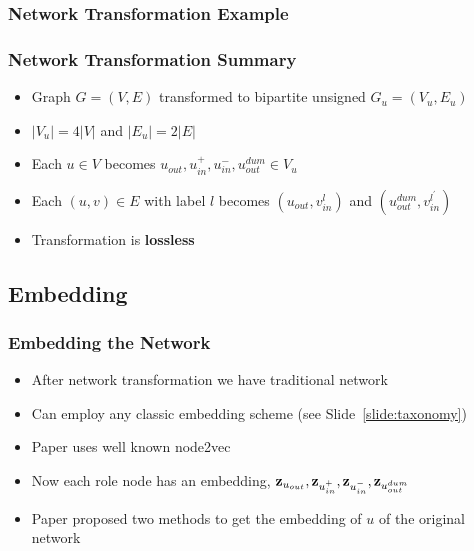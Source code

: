 \documentclass{beamer}
\begin{document}
\begin{frame}
    \frametitle{Network Transformation Example}
    
\end{frame}

\begin{frame}
    \frametitle{Network Transformation Summary}
    \begin{itemize}
        \item Graph $G=(V,E)$ transformed to bipartite unsigned $G_{u}=(V_{u},E_{u})$
        \item $|V_{u}|=4|V|$ and $|E_{u}|=2|E|$
        \item Each $u \in V$ becomes $u_{out},u_{in}^{+},u_{in}^{-},u_{out}^{dum} \in V_{u}$
        \item Each $(u,v) \in E$ with label $l$ becomes $(u_{out},v_{in}^{l})$ and $(u_{out}^{dum},v_{in}^{l^{\prime}})$
        \item Transformation is \textbf{lossless}
    \end{itemize}

\end{frame}


\subsection{Embedding}
\begin{frame}
    \frametitle{Embedding the Network}
    \begin{itemize}
        \item After network transformation we have traditional network
        \item Can employ any classic embedding scheme (see Slide~\ref{slide:taxonomy})
        \item Paper uses well known node2vec
        \item Now each role node has an embedding, $\mathbf{z}_{u_{out}},\mathbf{z}_{u_{in}^{+}},\mathbf{z}_{u_{in}^{-}},\mathbf{z}_{u_{out}^{dum}}$
        \item Paper proposed two methods to get the embedding of $u$ of the original network
    \end{itemize}
\end{frame}
\end{document}
